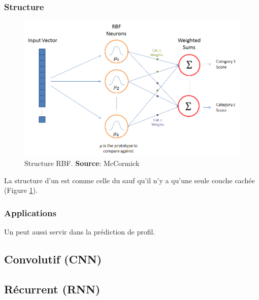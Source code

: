 \documentclass[12pt,a4paper,oneside, titlepage]{article}
\begin{document}
\subsubsection*{Structure}
\begin{figure}
 \centering
 \includegraphics[scale=0.5]{../figures/RBFstruct.png}
 \caption{Structure RBF. \textbf{Source}: McCormick\cite{RBFtuto}}
 \label{structurerbf}
\end{figure}
La structure d'un \rbf est comme celle du \mlp sauf qu'il n'y a qu'une seule couche cachée (Figure \ref{structurerbf}).
\subsubsection*{Applications}
Un \rbf peut aussi servir dans la prédiction de profil.\cite{statistica}

\subsection{Convolutif (CNN)}
\subsection{Récurrent (RNN)}
\end{document}
